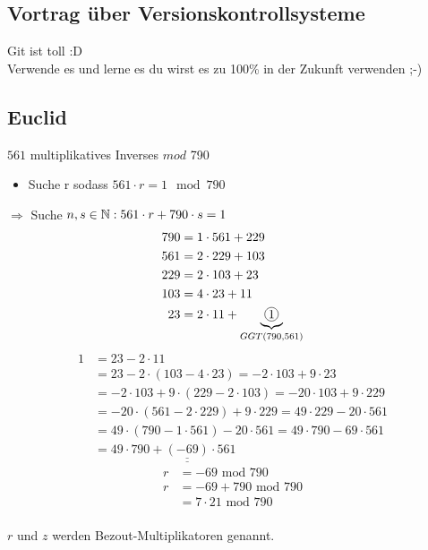\subsection{Vortrag über Versionskontrollsysteme}
Git ist toll :D\\
Verwende es und lerne es du wirst es zu 100\% in der Zukunft verwenden ;-)

\subsection{Euclid}
$561$ multiplikatives Inverses $mod$ 790\\
\begin{itemize}
    \item Suche r sodass $561 \cdot r = 1 \mod 790$
\end{itemize}
$\Rightarrow$ Suche $n, s \in \mathbb N: 561 \cdot r + 790 \cdot s = 1$\\
\begin{align*}
    790 &= 1 \cdot 561 + 229\\
    561 &= 2 \cdot 229 + 103\\
    229 &= 2 \cdot 103 + 23\\
    103 &= 4 \cdot 23 + 11\\
    23 &= 2 \cdot 11 + \underbrace{\circled{1}}_{GGT(790, 561)}
\end{align*}
\begin{align*}
    1 &= 23 - 2 \cdot 11\\
    &= 23 - 2 \cdot (103 - 4 \cdot 23) = -2 \cdot 103 + 9 \cdot 23\\
    &= - 2 \cdot 103 + 9\cdot (229 - 2 \cdot 103) = -20 \cdot 103 + 9 \cdot 229\\
    &= -20 \cdot (561 - 2 \cdot 229) + 9 \cdot 229 = 49 \cdot 229 - 20 \cdot 561\\
    &= 49 \cdot (790 - 1 \cdot 561) - 20 \cdot 561 = 49 \cdot 790 - 69 \cdot 561\\
    &= 49 \cdot 790 + \underline{\underline{(-69)}} \cdot 561
\end{align*}
\begin{align*}
    r &= -69 \text{ mod } 790\\
    r &= -69 + 790 \text{ mod } 790\\
    &= 7 \cdot 21 \text{ mod } 790\\
\end{align*}

$r$ und $z$ werden Bezout-Multiplikatoren genannt.